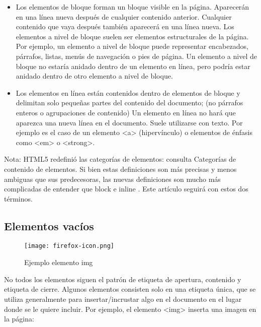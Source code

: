 \begin{itemize}
	\item Los elementos de bloque forman un bloque visible en la página. Aparecerán en una línea nueva después de cualquier contenido anterior. Cualquier contenido que vaya después también aparecerá en una línea nueva. Los elementos a nivel de bloque suelen ser elementos estructurales de la página. Por ejemplo, un elemento a nivel de bloque puede representar encabezados, párrafos, listas, menús de navegación o pies de página. Un elemento a nivel de bloque no estaría anidado dentro de un elemento en línea, pero podría estar anidado dentro de otro elemento a nivel de bloque.
	\item Los elementos en línea están contenidos dentro de elementos de bloque y delimitan solo pequeñas partes del contenido del documento; (no párrafos enteros o agrupaciones de contenido) Un elemento en línea no hará que aparezca una nueva línea en el documento. Suele utilizarse con texto. Por ejemplo es el caso de un elemento <a> (hipervínculo) o elementos de énfasis como <em> o <strong>.
\end{itemize}

\begin{remark}
Nota: HTML5 redefinió las categorías de elementos: consulta Categorías de contenido de elementos. Si bien estas definiciones son más precisas y menos ambiguas que sus predecesoras, las nuevas definiciones son mucho más complicadas de entender que block e inline . Este artículo seguirá con estos dos términos.
\end{remark}

\subsection{Elementos vacíos}

\begin{wrapfigure}{r}{0.5\textwidth}
	\begin{center}
		\texttt{[image: firefox-icon.png]}
	\end{center}
	\caption{Ejemplo elemento img}
\end{wrapfigure}

No todos los elementos siguen el patrón de etiqueta de apertura, contenido y etiqueta de cierre. Algunos elementos consisten solo en una etiqueta única, que se utiliza generalmente para insertar/incrustar algo en el documento en el lugar donde se le quiere incluir. Por ejemplo, el elemento <img> inserta una imagen en la página:

